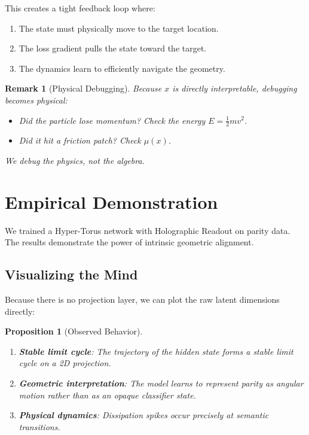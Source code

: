 \documentclass[12pt,letterpaper,twoside]{article}
\newtheorem{remarque}{Remark}[section]
\newtheorem{prop}{Proposition}[section]
\begin{document}
This creates a tight feedback loop where:
\begin{enumerate}
\item The state must physically move to the target location.
\item The loss gradient pulls the state toward the target.
\item The dynamics learn to efficiently navigate the geometry.
\end{enumerate}

\begin{remarque}[Physical Debugging]
Because $x$ is directly interpretable, debugging becomes physical:
\begin{itemize}
\item Did the particle lose momentum? Check the energy $E = \frac{1}{2}mv^2$.
\item Did it hit a friction patch? Check $\mu(x)$.
\end{itemize}
We debug the physics, not the algebra.
\end{remarque}

\section{Empirical Demonstration}

We trained a Hyper-Torus network with Holographic Readout on parity data. The results demonstrate the power of intrinsic geometric alignment.

\subsection{Visualizing the Mind}

Because there is no projection layer, we can plot the raw latent dimensions directly:

\begin{prop}[Observed Behavior]
\begin{enumerate}
\item \textbf{Stable limit cycle}: The trajectory of the hidden state forms a stable limit cycle on a 2D projection.
\item \textbf{Geometric interpretation}: The model learns to represent parity as angular motion rather than as an opaque classifier state.
\item \textbf{Physical dynamics}: Dissipation spikes occur precisely at semantic transitions.
\end{enumerate}
\end{prop}
\end{document}
